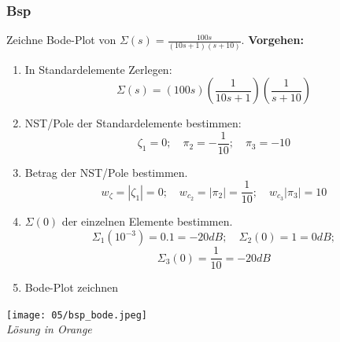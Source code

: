         \subsubsection{Bsp}
            Zeichne Bode-Plot von $\Sigma(s)=\frac{100s}{(10s+1)(s+10)}$.
            \textbf{Vorgehen:}
            \begin{enumerate}
                \item In Standardelemente Zerlegen:
                \[\Sigma(s)=(100s)(\frac{1}{10s+1})(\frac{1}{s+10})\]
                \item NST/Pole der Standardelemente bestimmen:
                \[\zeta_1=0;\quad \pi_2=-\frac{1}{10};\quad\pi_3=-10\]
                \item Betrag der NST/Pole bestimmen.
                \[w_{\zeta}=|\zeta_1|=0;\quad w_{c_2}=|\pi_2|=\frac{1}{10};\quad w_{c_3}|\pi_3|=10\]
                \item $\Sigma(0)$ der einzelnen Elemente bestimmen.
                \[\Sigma_1(10^{-3})=0.1=-20dB;\quad \Sigma_2(0)=1=0dB;\]
                \vspace{-5mm}\[\Sigma_3(0)=\frac{1}{10}=-20dB\]
                \item Bode-Plot zeichnen 
            \end{enumerate}
            \begin{center}
                \texttt{[image: 05/bsp\_bode.jpeg]}
                \\\textit{Lösung in Orange}
            \end{center}
